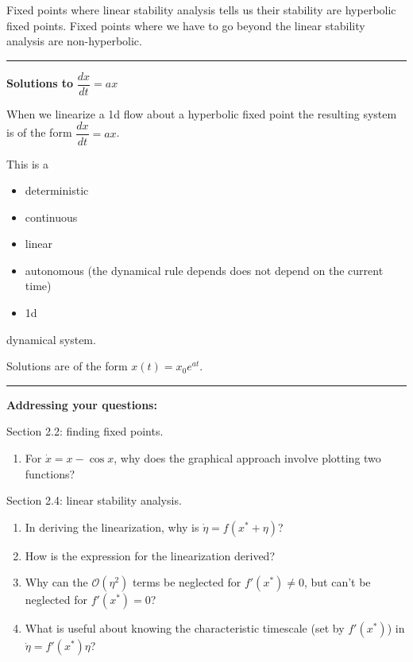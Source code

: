 \documentclass[12pt,letterpaper,noanswers]{exam}
\begin{document}
Fixed points where linear stability analysis tells us their stability are hyperbolic fixed points.  Fixed points where we have to go beyond the linear stability analysis are non-hyperbolic.
\vfill

\vspace{0.2cm}

\hrule
\vspace{0.2cm}

\noindent \textbf{Solutions to} $\dfrac{dx}{dt} = a x$

When we linearize a 1d flow about a hyperbolic fixed point the resulting system is of the form $\dfrac{dx}{dt} = a x$.

This is a
\begin{itemize}
\itemsep-0.3em
    \item deterministic
    \item continuous
    \item linear
    \item autonomous (the dynamical rule depends does not depend on the current time)
    \item 1d
\end{itemize}
dynamical system.

Solutions are of the form $x(t) = x_0 e^{at}$.

\vspace{3in}

\vspace{0.2cm}

\hrule
\vspace{0.2cm}


\noindent \textbf{Addressing your questions:}

Section 2.2: finding fixed points.
\begin{enumerate}
\itemsep-0.2em
    \item For $\dot x = x - \cos x$, why does the graphical approach involve plotting two functions? 
\end{enumerate}


Section 2.4: linear stability analysis.
\begin{enumerate}
\itemsep-0.2em
    \item In deriving the linearization, why is $\dot \eta = f(x^* + \eta)$?
    \item How is the expression for the linearization derived?
    \item Why can the $\mathcal{O}(\eta^2)$ terms be neglected for $f'(x^*)\neq 0$, but can't be neglected for $f'(x^*) = 0$?
    \item What is useful about knowing the characteristic timescale (set by $f'(x^*)$) in $\dot \eta = f'(x^*)\eta$?
\end{enumerate}
\end{document}
